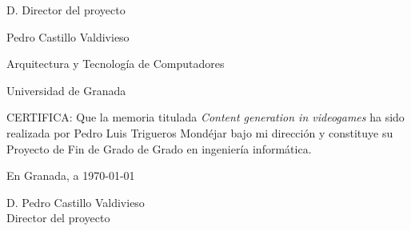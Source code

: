 %
%

\begin{center}
	\begin{minipage}[t][6cm][l]{.8\textwidth}
		\begin{center}
			D. {\sc Director del proyecto}

			Pedro Castillo Valdivieso

			Arquitectura y Tecnología de Computadores

			Universidad de Granada
		\end{center}
	\end{minipage}
\end{center}

CERTIFICA:
Que la memoria titulada {\it Content generation in videogames} ha sido realizada por {\sc Pedro Luis Trigueros Mondéjar} bajo mi dirección y constituye su Proyecto de Fin de Grado de Grado en ingeniería informática.

\vspace{5cm}

En Granada, a \today

\vspace{3cm}

\begin{center}
	\begin{minipage}[t][4cm][l]{.5\textwidth}
	D. {\sc Pedro Castillo Valdivieso}
	\\
	Director del proyecto
	\end{minipage}
\end{center}

